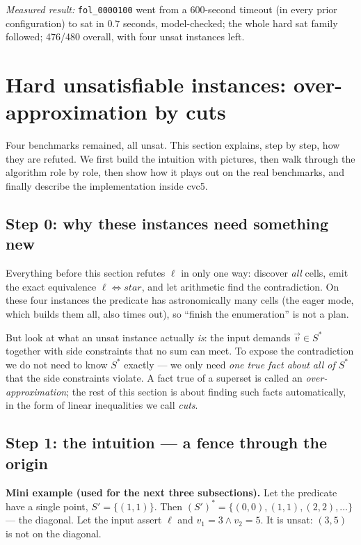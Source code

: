 \documentclass[11pt]{article}
\newcommand{\cvc}{\textsf{cvc5}\xspace}
\newcommand{\Sset}{\ensuremath{S}}
\newcommand{\Sstar}{\ensuremath{S^{*}}}
\newcommand{\vv}{\ensuremath{\vec{v}}\xspace}
\begin{document}
\emph{Measured result:} \texttt{fol\_0000100} went from a 600-second
timeout (in every prior configuration) to \textsf{sat} in $0.7$ seconds,
model-checked; the whole hard \textsf{sat} family followed; 476/480
overall, with four \textsf{unsat} instances left.

\section{Hard unsatisfiable instances: over-approximation by cuts}
\label{sec:cuts}

Four benchmarks remained, all \textsf{unsat}. This section explains, step
by step, how they are refuted. We first build the intuition with pictures,
then walk through the algorithm role by role, then show how it plays out
on the real benchmarks, and finally describe the implementation inside
\cvc.

\subsection{Step 0: why these instances need something new}

Everything before this section refutes $\ell$ in only one way: discover
\emph{all} cells, emit the exact equivalence
$\ell \Leftrightarrow \mathit{star}$, and let arithmetic find the
contradiction. On these four instances the predicate has astronomically
many cells (the eager mode, which builds them all, also times out), so
``finish the enumeration'' is not a plan.

But look at what an \textsf{unsat} instance actually \emph{is}: the input
demands $\vv \in \Sstar$ together with side constraints that no sum can
meet. To expose the contradiction we do not need to know $\Sstar$ exactly
--- we only need \emph{one true fact about all of $\Sstar$} that the side
constraints violate. A fact true of a superset is called an
\emph{over-approximation}; the rest of this section is about finding such
facts automatically, in the form of linear inequalities we call
\emph{cuts}.

\subsection{Step 1: the intuition --- a fence through the origin}

\begin{exbox}
\textbf{Mini example (used for the next three subsections).} Let the
predicate have a single point, $\Sset' = \{(1,1)\}$. Then
$(S')^{*} = \{(0,0), (1,1), (2,2), \ldots\}$ --- the diagonal. Let the
input assert $\ell$ and $v_1 = 3 \wedge v_2 = 5$. It is \textsf{unsat}:
$(3,5)$ is not on the diagonal.
\end{exbox}
\end{document}
